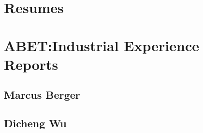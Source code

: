 


\section{Resumes}




\section{ABET:Industrial Experience Reports}

\subsection{Marcus Berger}

% 

\subsection{Dicheng Wu}

% 


